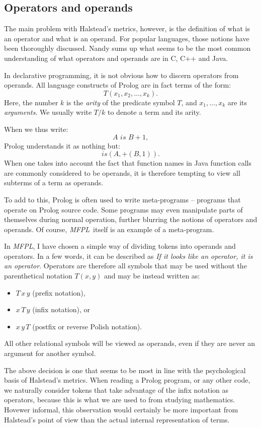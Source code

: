 \documentclass[11pt,a4paper,twoside]{article}
\newcommand{\pname}{\emph{MFPL}}
\begin{document}
\begin{multicols}{2}
\subsection{Operators and operands}
The main problem with Halstead's metrics, however, is the definition
of what is an operator and what is an operand. For popular languages,
those notions have been thoroughly discussed. Nandy \cite{nandy} sums
up what seems to be the most common understanding of what operators
and operands are in C, C++ and Java. 

In declarative programming, it is not obvious how to discern operators
from operands. All language constructs of Prolog are in fact terms of
the form:
$$T(x_1, x_2, \dots, x_k).$$ 
Here, the number $k$ is the \emph{arity}
of the predicate symbol $T$, and $x_1, \dots, x_k$ are its
\emph{arguments}. We usually write $T/k$ to denote a term and its arity. 

When we thus write:
$$A\,\, is\,\, B + 1,$$ 
Prolog understands it as nothing but:
$$is(A, +(B, 1)).$$ When one takes into account the fact that function
names in Java function calls are commonly considered to be operands,
it is therefore tempting to view all subterms of a term as operands.

To add to this, Prolog is often used to write meta-programs --
programs that operate on Prolog source code. Some programs may even
manipulate parts of themselves during normal operation, further
blurring the notions of operators and operands. Of course,
\pname\ itself is an example of a meta-program.

In \pname, I have chosen a simple way of dividing tokens into operands
and operators. In a few words, it can be described as \emph{If it looks
  like an operator, it is an operator}. Operators are therefore all
symbols that may be used without the parenthetical notation $T(x, y)$
and may be instead written as: 
\begin{itemize}
\item $T\, x\, y$ (prefix notation),
\item $x\,T\, y$ (infix notation), or 
\item $x\, y\, T$ (postfix or reverse Polish notation).
\end{itemize}
All other relational symbols will be viewed as operands, even if they
are never an argument for another symbol.

The above decision is one that seems to be most in line with the
psychological basis of Halstead's metrics. When reading a Prolog
program, or any other code, we naturally consider tokens that take
advantage of the infix notation as operators, because this is what we
are used to from studying mathematics. Hovewer informal, this
observation would certainly be more important from Halstead's point of
view than the actual internal representation of terms.


\end{multicols}
\end{document}
